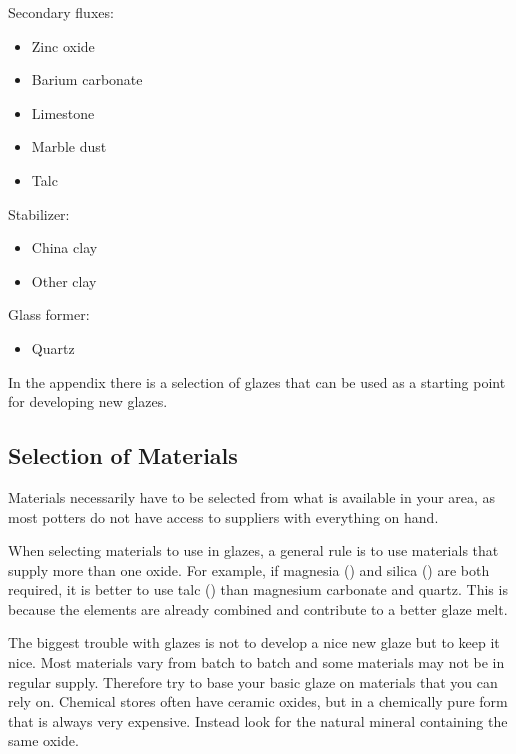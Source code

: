 Secondary fluxes:
\begin{itemize}
  \item Zinc oxide
  \item Barium carbonate
  \item Limestone
  \item Marble dust
  \item Talc
\end{itemize}

Stabilizer:
\begin{itemize}
  \item China clay
  \item Other clay
\end{itemize}

Glass former:
\begin{itemize}
  \item Quartz
\end{itemize}

In the appendix there is a selection of glazes that can be used as a starting 
point for developing new glazes.

\subsection{Selection of Materials}
Materials necessarily have to be selected from what is available in your area, 
as most potters do not have access to suppliers with everything on hand.

When selecting materials to use in glazes, a general rule is to use materials 
that supply more than one oxide. For example, if magnesia () and silica 
() are both required, it is better to use talc () than 
magnesium carbonate and quartz. This is because the elements are already 
combined and contribute to a better glaze melt.

The biggest trouble with glazes is not to develop a nice new glaze but to keep 
it nice. Most materials vary from batch to batch and some materials may not be 
in regular supply. Therefore try to base your basic glaze on materials that you 
can rely on. Chemical stores often have ceramic oxides, but in a chemically 
pure form that is always very expensive. Instead look for the natural mineral 
containing the same oxide.


